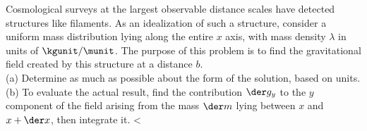 Cosmological surveys at the largest observable distance scales have
detected structures like filaments. As an idealization of such a structure, consider a
uniform mass distribution lying along the entire $x$ axis, with mass density $\lambda$
in units of $\kgunit/\munit$. The purpose of this problem is to 
find the gravitational field created by this structure at a distance $b$.\\
(a) Determine as much as possible about the form of the solution, based on units.\\
(b) To evaluate the actual result, find the contribution $\der g_y$ to the $y$ component of the field arising
from the mass $\der m$ lying between $x$ and $x+\der x$, then integrate it.
        <%
